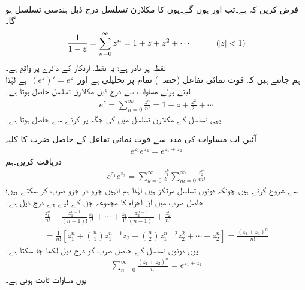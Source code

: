 %
\quad {}\\
فرض کریں کہ  ہے۔تب  اور  ہوں گے۔یوں  کا مکلارن تسلسل درج ذیل ہندسی تسلسل ہو گا۔
\begin{align}\label{مساوات_ٹیلر_ہندسی_تسلسل_مثال}
\frac{1}{1-z}=\sum\limits_{n=0}^{\infty} z^n=1+z+z^2+\cdots \quad \quad \quad (\abs{z}<1)
\end{align}
 نقطہ  پر نادر ہے؛ یہ نقطہ ارتکاز کے دائرے پر واقع ہے۔
\quad {}\\
ہم جانتے ہیں کہ قوت نمائی تفاعل  (حصہ ) تمام  پر تحلیلی ہے اور 
$\,(e^z)'=e^z\,$
ہے لہٰذا  لیتے ہوئے مساوات  سے درج ذیل مکلارن تسلسل حاصل ہوتا ہے۔
\begin{align}\label{مساوات_ٹیلر_قوت_نمائی_مکلارن_تسلسل}
e^z=\sum\limits_{n=0}^{\infty} \frac{z^n}{n!}=1+z+\frac{z^2}{2!}+\cdots
\end{align}
یہی تسلسل  کے مکلارن تسلسل میں  کی جگہ  پر کرنے سے حاصل ہوتا ہے۔

آئیں اب مساوات  کی مدد سے قوت نمائی تفاعل کے حاصل ضرب کا کلیہ
\begin{align}\label{مساوات_ٹیلر_قوت_نمائی_حاصل_ضرب}
e^{z_1}e^{z_2}=e^{z_1+z_2}
\end{align}
دریافت کریں۔ہم
\begin{align*}
e^{z_1}e^{z_2}=\sum\limits_{k=0}^{\infty} \frac{z_1^k}{k!}\sum\limits_{m=0}^{\infty}\frac{z_2^m}{m!}
\end{align*}
سے شروع کرتے ہیں۔چونکہ دونوں تسلسل مرتکز ہیں لہٰذا ہم انہیں جزو در جزو ضرب کر سکتے ہیں؛حاصل ضرب میں ان  اجزاء کا مجموعہ جن کے لیے  ہے درج ذیل ہے۔
\begin{multline*}
\frac{z_1^n}{n!}+\frac{z_1^{n-1}}{(n-1)!}\frac{z_2}{1!}+\cdots+\frac{z_1}{1!}\frac{z_2^{n-1}}{(n-1)!}+\frac{z_2^n}{n!}\\
=\frac{1}{n!}[z_1^n+\binom{n}{1}z_1^{n-1}z_2+\binom{n}{2}z_1^{n-2}z_2^2+\cdots+z_2^n]=\frac{(z_1+z_2)^n}{n!}
\end{multline*}
یوں دونوں تسلسل کے حاصل ضرب کو درج ذیل لکھا جا سکتا ہے۔
\begin{align*}
\sum\limits_{n=0}^{\infty}\frac{(z_1+z_2)^n}{n!}=e^{z_1+z_2}
\end{align*}
یوں مساوات  ثابت ہوتی ہے۔

